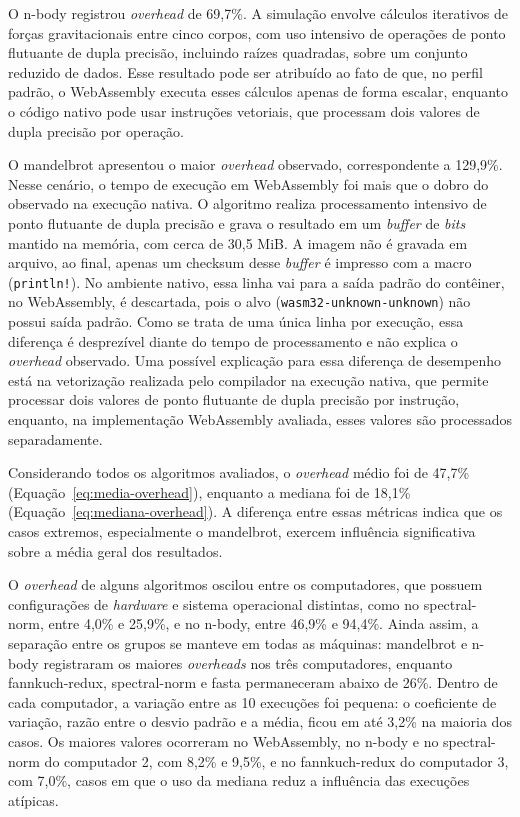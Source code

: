 O n-body registrou \emph{overhead} de 69,7\%. A simulação envolve cálculos iterativos de forças gravitacionais entre cinco corpos, com uso intensivo de operações de ponto flutuante de dupla precisão, incluindo raízes quadradas, sobre um conjunto reduzido de dados. Esse resultado pode ser atribuído ao fato de que, no perfil padrão, o WebAssembly executa esses cálculos apenas de forma escalar, enquanto o código nativo pode usar instruções vetoriais, que processam dois valores de dupla precisão por operação.

O mandelbrot apresentou o maior \emph{overhead} observado, correspondente a 129,9\%. Nesse cenário, o tempo de execução em WebAssembly foi mais que o dobro do observado na execução nativa. O algoritmo realiza processamento intensivo de ponto flutuante de dupla precisão e grava o resultado em um \emph{buffer} de \emph{bits} mantido na memória, com cerca de 30,5 MiB. A imagem não é gravada em arquivo, ao final, apenas um checksum desse \emph{buffer} é impresso com a macro (\texttt{println!}). No ambiente nativo, essa linha vai para a saída padrão do contêiner, no WebAssembly, é descartada, pois o alvo (\texttt{wasm32-unknown-unknown}) não possui saída padrão. Como se trata de uma única linha por execução, essa diferença é desprezível diante do tempo de processamento e não explica o \emph{overhead} observado. Uma possível explicação para essa diferença de desempenho está na vetorização realizada pelo compilador na execução nativa, que permite processar dois valores de ponto flutuante de dupla precisão por instrução, enquanto, na implementação WebAssembly avaliada, esses valores são processados separadamente.

Considerando todos os algoritmos avaliados, o \emph{overhead} médio foi de 47,7\% (Equação~\eqref{eq:media-overhead}), enquanto a mediana foi de 18,1\% (Equação~\eqref{eq:mediana-overhead}). A diferença entre essas métricas indica que os casos extremos, especialmente o mandelbrot, exercem influência significativa sobre a média geral dos resultados.

O \emph{overhead} de alguns algoritmos oscilou entre os computadores, que possuem configurações de \emph{hardware} e sistema operacional distintas, como no spectral-norm, entre 4,0\% e 25,9\%, e no n-body, entre 46,9\% e 94,4\%. Ainda assim, a separação entre os grupos se manteve em todas as máquinas: mandelbrot e n-body registraram os maiores \emph{overheads} nos três computadores, enquanto fannkuch-redux, spectral-norm e fasta permaneceram abaixo de 26\%. Dentro de cada computador, a variação entre as 10 execuções foi pequena: o coeficiente de variação, razão entre o desvio padrão e a média, ficou em até 3,2\% na maioria dos casos. Os maiores valores ocorreram no WebAssembly, no n-body e no spectral-norm do computador 2, com 8,2\% e 9,5\%, e no fannkuch-redux do computador 3, com 7,0\%, casos em que o uso da mediana reduz a influência das execuções atípicas.

